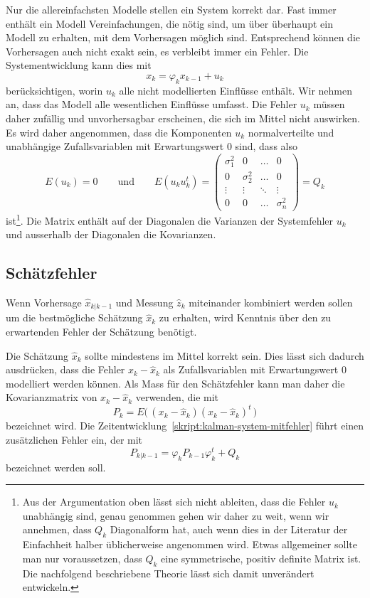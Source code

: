 Nur die allereinfachsten Modelle stellen ein System korrekt dar.
Fast immer enthält ein Modell Vereinfachungen, die nötig sind, um über
überhaupt ein Modell zu erhalten, mit dem Vorhersagen möglich sind.
Entsprechend können die Vorhersagen auch nicht exakt sein, es verbleibt
immer ein Fehler.
Die Systementwicklung kann dies mit
\begin{equation}
x_k = \varphi_k x_{k-1} + u_k
\label{skript:kalman-system-mitfehler}
\end{equation}
berücksichtigen, worin $u_k$ alle nicht modellierten Einflüsse
enthält. 
Wir nehmen an, dass das Modell alle wesentlichen Einflüsse umfasst.
Die Fehler $u_k$ müssen daher zufällig und unvorhersagbar erscheinen,
die sich im Mittel nicht auswirken.
Es wird daher angenommen, dass die Komponenten $u_k$ normalverteilte
und unabhängige Zufallsvariablen mit Erwartungswert $0$ sind, dass also
\[
E(u_k)=0
\qquad\text{und}\qquad
E(u_ku_k^t)
=
\begin{pmatrix}
\sigma_1^2&0         &\dots &0\\
0         &\sigma_2^2&\dots &0\\
\vdots    &\vdots    &\ddots&\vdots\\
0         &0         &\dots &\sigma_n^2
\end{pmatrix}
=
Q_k
\]
ist\footnote{%
Aus der Argumentation oben lässt sich nicht ableiten, dass
die Fehler $u_k$ unabhängig sind, genau genommen gehen wir daher zu
weit, wenn wir annehmen, dass $Q_k$ Diagonalform hat, auch wenn dies
in der Literatur der Einfachheit halber üblicherweise angenommen wird.
Etwas allgemeiner sollte man nur voraussetzen, dass $Q_k$ eine symmetrische,
positiv definite Matrix ist.
Die nachfolgend beschriebene Theorie lässt sich damit unverändert
entwickeln.
}.
Die Matrix enthält auf der Diagonalen die Varianzen der Systemfehler $u_k$ 
und ausserhalb der Diagonalen die Kovarianzen.

\subsection{Schätzfehler\label{subsection:schaetzfehler}}
Wenn Vorhersage $\hat{x}_{k|k-1}$ und Messung $\hat{z}_k$ 
miteinander kombiniert werden sollen um die bestmögliche Schätzung
$\hat{x}_k$ zu erhalten, wird Kenntnis über den zu erwartenden
Fehler der Schätzung benötigt.

Die Schätzung $\hat{x}_k$ sollte mindestens im Mittel korrekt sein.
Dies lässt sich dadurch ausdrücken, dass die Fehler $x_k - \hat{x}_k$
als Zufallsvariablen mit Erwartungswert $0$ modelliert werden können.
Als Mass für den Schätzfehler kann man daher die Kovarianzmatrix von
$x_k-\hat{x}_k$ verwenden, die mit
\[
P_k =  E\bigl(\, (x_k-\hat{x}_k) (x_k-\hat{x}_k)^t\,\bigr)
\]
bezeichnet wird.
Die Zeitentwicklung~\eqref{skript:kalman-system-mitfehler} führt einen
zusätzlichen Fehler ein, der mit
\begin{equation}
P_{k|k-1} = \varphi_k P_{k-1} \varphi_k^t + Q_k
\label{skript:kalman:fehlerentwicklung}
\end{equation}
bezeichnet werden soll.

